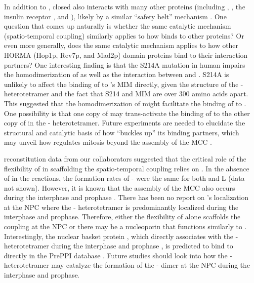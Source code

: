 In addition to , closed  also interacts with many other proteins (including ,  \cite{SGO2-MAD2}, the insulin receptor \cite{MCC_IREndocytosis}, and  \cite{KIF20A-MAD2}), likely by a similar ``safety belt'' mechanism \cite{Structure1GO4}. One question that comes up naturally is whether the same catalytic mechanism (spatio-temporal coupling) similarly applies to how  binds to other proteins? Or even more generally, does the same catalytic mechanism applies to how other HORMA (Hop1p, Rev7p, and Mad2p) domain proteins \cite{HORMAReview} bind to their interaction partners? One interesting finding is that the S214A mutation in human  impairs the homodimerization of  as well as the interaction between  and  \cite{ATMPhosphorylatesMad1S214}. S214A is unlikely to affect the binding of  to 's MIM directly, given the structure of the - heterotetramer \cite{Structure1GO4} and the fact that S214 and MIM are over 300 amino acids apart. This suggested that the homodimerization of  might facilitate the binding of  to . One possibility is that one copy of  may trans-activate the binding of  to the other copy of  in the - heterotetramer. Future experiments are needed to elucidate the structural and catalytic basis of how  ``buckles up'' its binding partners, which may unveil how  regulates mitosis beyond the assembly of the MCC \cite{Separase-SGO2-MAD2, KIF20A-MAD2}. %

 reconstitution data from our collaborators suggested that the critical role of the flexibility of  in scaffolding the spatio-temporal coupling relies on . In the absence of  in the reactions, the formation rates of - were the same for both  and \textDelta{}L (data not shown). However, it is known that the assembly of the MCC also occurs during the interphase and prophase \cite{PremitoticMCC}. There has been no report on 's localization at the NPC where the - heterotetramer is predominantly localized during the interphase and prophase. Therefore, either the flexibility of  alone scaffolds the coupling at the NPC or there may be a nucleoporin that functions similarly to . Interestingly, the nuclear basket protein , which directly associates with the - heterotetramer during the interphase and prophase \cite{TPR-MAD1_Lee2008}, is predicted to bind to  directly in the PrePPI database \cite{PrePPI}. Future studies should look into how the - heterotetramer may catalyze the formation of the - dimer at the NPC during the interphase and prophase.

